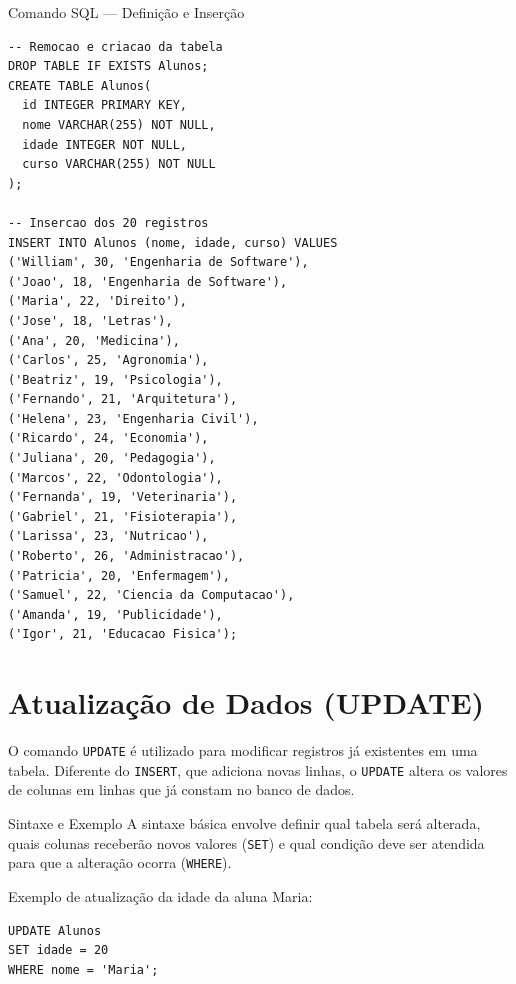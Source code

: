 \documentclass[12pt]{article}
\begin{document}
\vspace{1em}
\begin{block}{Comando SQL --- Definição e Inserção}
\begin{lstlisting}
-- Remocao e criacao da tabela
DROP TABLE IF EXISTS Alunos;
CREATE TABLE Alunos(
  id INTEGER PRIMARY KEY,
  nome VARCHAR(255) NOT NULL,
  idade INTEGER NOT NULL,
  curso VARCHAR(255) NOT NULL
);

-- Insercao dos 20 registros
INSERT INTO Alunos (nome, idade, curso) VALUES
('William', 30, 'Engenharia de Software'),
('Joao', 18, 'Engenharia de Software'),
('Maria', 22, 'Direito'),
('Jose', 18, 'Letras'),
('Ana', 20, 'Medicina'),
('Carlos', 25, 'Agronomia'),
('Beatriz', 19, 'Psicologia'),
('Fernando', 21, 'Arquitetura'),
('Helena', 23, 'Engenharia Civil'),
('Ricardo', 24, 'Economia'),
('Juliana', 20, 'Pedagogia'),
('Marcos', 22, 'Odontologia'),
('Fernanda', 19, 'Veterinaria'),
('Gabriel', 21, 'Fisioterapia'),
('Larissa', 23, 'Nutricao'),
('Roberto', 26, 'Administracao'),
('Patricia', 20, 'Enfermagem'),
('Samuel', 22, 'Ciencia da Computacao'),
('Amanda', 19, 'Publicidade'),
('Igor', 21, 'Educacao Fisica');
\end{lstlisting}
\end{block}
\section{Atualização de Dados (UPDATE)}

O comando \texttt{UPDATE} é utilizado para modificar registros já existentes em uma tabela. Diferente do \texttt{INSERT}, que adiciona novas linhas, o \texttt{UPDATE} altera os valores de colunas em linhas que já constam no banco de dados.

\begin{block}{Sintaxe e Exemplo}
A sintaxe básica envolve definir qual tabela será alterada, quais colunas receberão novos valores (\texttt{SET}) e qual condição deve ser atendida para que a alteração ocorra (\texttt{WHERE}).

Exemplo de atualização da idade da aluna Maria:
\begin{lstlisting}
UPDATE Alunos 
SET idade = 20 
WHERE nome = 'Maria';
\end{lstlisting}
\end{block}
\end{document}
